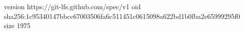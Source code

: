 version https://git-lfs.github.com/spec/v1
oid sha256:1c95340147bbcc67003506fa6c511451c0615098a622bd1b0fba2e65999295f0
size 1975

